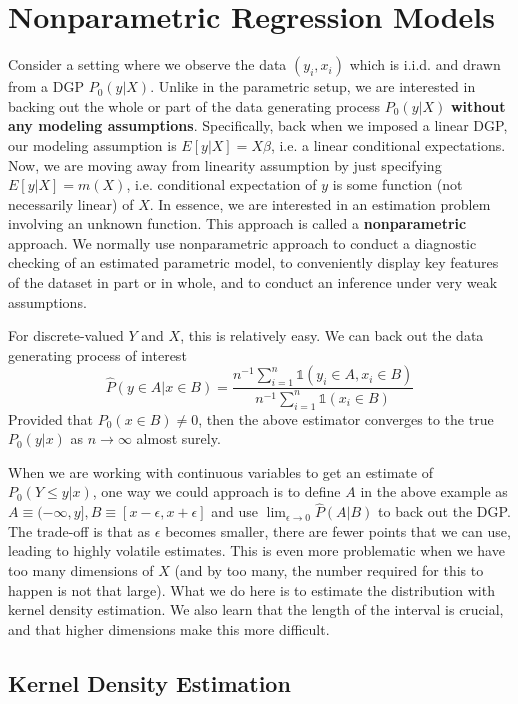 \documentclass[12pt]{article}
\theoremstyle{definition}
\theoremstyle{property}
\theoremstyle{assumption}
\theoremstyle{example}
\theoremstyle{comment}
\begin{document}
\section{Nonparametric Regression Models}
Consider a setting where we observe the data $(y_i,x_i)$ which is i.i.d. and drawn from a DGP $P_0(y|X)$. Unlike in the parametric setup, we are interested in backing out the whole or part of the data generating process $P_0(y|X)$ \textbf{without any modeling assumptions}. Specifically, back when we imposed a linear DGP, our modeling assumption is $E[y|X]=X\beta$, i.e. a linear conditional expectations. Now, we are moving away from linearity assumption by just specifying $E[y|X]=m(X)$, i.e. conditional expectation of $y$ is some function (not necessarily linear) of $X$. In essence, we are interested in an estimation problem involving an unknown function. This approach is called a \textbf{nonparametric} approach. We normally use nonparametric approach to conduct a diagnostic checking of an estimated parametric model, to conveniently display key features of the dataset in part or in whole, and to conduct an inference under very weak assumptions. \par
For discrete-valued $Y$ and $X$, this is relatively easy. We can back out the data generating process of interest
\[
\widehat{P}(y\in A| x\in B)=\frac{n^{-1}\sum_{i=1}^n\mathbb{1}(y_i\in A, x_i\in B) }{n^{-1}\sum_{i=1}^n\mathbb{1}(x_i\in B)}
\]
Provided that $P_0(x\in B)\neq 0$, then the above estimator converges to the true $P_0(y|x)$ as $n\to\infty$ almost surely.
\par
When we are working with continuous variables to get an estimate of $P_0(Y\leq y|x)$, one way we could approach is to define $A$ in the above example as $A\equiv (-\infty, y], B\equiv[x-\epsilon, x+\epsilon]$ and use $\lim_{\epsilon\to0}\widehat{P}(A|B)$ to back out the DGP. The trade-off is that as $\epsilon$ becomes smaller, there are fewer points that we can use, leading to highly volatile estimates. This is even more problematic when we have too many dimensions of $X$ (and by too many, the number required for this to happen is not that large). What we do here is to estimate the distribution with kernel density estimation. We also learn that the length of the interval is crucial, and that higher dimensions make this more difficult.
\subsection{Kernel Density Estimation} 
\end{document}
